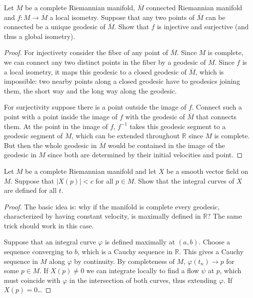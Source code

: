 \documentclass{book}
\begin{document}
\begin{exercise}
\label{exercise-local-isometry-hopf-rinow}
\begin{reference}
\cite[Exercise 8, Chapter VIII]{doc}
\end{reference}
Let $M$ be a complete Riemannian manifold,
$\overline{M}$ connected Riemannian manifold
and $f:M \to \overline{M}$ a local isometry.
Suppose that any two points of $\overline{M}$
can be connected be a unique geodesic
of $\overline{M}$.
Show that $f$ is injective and surjective
(and thus a global isometry).
\end{exercise}

\begin{proof}
For injectivety consider the fiber of
any point of $\overline{M}$. Since $M$
is complete, we can connect any two distinct
points in the fiber by a geodesic of $M$.
Since $f$ is a local isometry, it maps
this geodesic to a closed geodesic of
$\overline{M}$, which is impossible:
two nearby points along a closed geodesic
have to geodesics joining them, the short
way and the long way along the geodesic.

For surjectivity suppose there is a point
outside the image of $f$. Connect such a
point with a point inside the image of $f$
with the geodesic of $\overline{M}$
that connects them. At the point in the image
of $f$,  $f^{-1}$ takes this geodesic segment
to a geodesic segment of $M$,
which can be extended
throughout $\mathbb{R}$ since $M$ is
complete. But then the whole geodesic in
$\overline{M}$ would be contained in the
image of the geodesic in $M$ since both
are determined by their initial velocities
and point.
\end{proof}

\begin{exercise}
\label{exercise-bounded-flow-speed}
\begin{reference}
\cite[Exercise 11, Chapter VII]{doc}
\end{reference}
Let $M$ be a complete Riemannian manifold
and let $X$ be a smooth vector field on $M$.
Suppose that $|X(p)|<c$ for all $p \in M$.
Show that the integral curves of $X$
are defined for all $t$.
\end{exercise}

\begin{proof}
The basic idea is:
why if the manifold is complete
every geodesic,
characterized by having constant
velocity,
is maximally defined in $\mathbb{R}$?
The same trick should work in this case.

Suppose that an integral curve $\varphi$
is defined maximally at $(a,b)$.
Choose a sequence converging to $b$,
which is a Cauchy sequence in $\mathbb{R}$.
This gives a Cauchy sequence in $M$
along $\varphi$ by continuity.
By completeness of $M$, $\varphi(t_n) \to p$
for some $p \in M$.
If $X(p) \neq 0$ we can integrate locally
to find a flow $\psi$ at $p$,
which must coincide with $\varphi$ in
the intersection of both curves,
thus extending $\varphi$.
If $X(p)=0$…
\end{proof}
\end{document}
